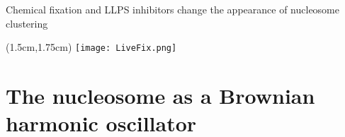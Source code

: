 \documentclass{beamer}					%
\begin{document}
\begin{frame}{Chemical fixation and LLPS inhibitors change the appearance of nucleosome clustering}
\begin{textblock*}{12cm}(1.5cm,1.75cm)
\texttt{[image: LiveFix.png]}
\end{textblock*}
\end{frame}

\section{The nucleosome as a Brownian harmonic oscillator}

\end{document}
